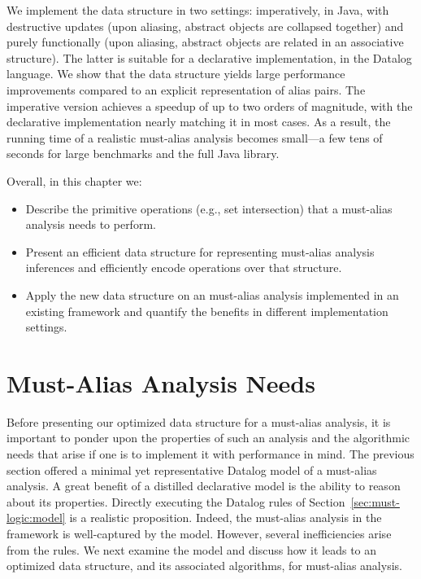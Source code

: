 We implement the data structure in two settings: imperatively, in Java, with destructive updates (upon aliasing, abstract objects are collapsed together) and purely functionally (upon aliasing, abstract objects are related in an associative structure). The latter is suitable for a declarative implementation, in the Datalog language. We show that the data structure yields large performance improvements compared to an explicit representation of alias pairs. The imperative version achieves a speedup of up to two orders of magnitude, with the declarative implementation nearly matching it in most cases. As a result, the running time of a realistic must-alias analysis becomes small---a few tens of seconds for large benchmarks and the full Java library.

Overall, in this chapter we:

\begin{itemize}
\item Describe the primitive operations (e.g., set intersection) that a must-alias analysis needs to perform.
\item Present an efficient data structure for representing must-alias analysis inferences and efficiently encode operations over that structure.
\item Apply the new data structure on an must-alias analysis implemented in an existing framework and quantify the benefits in different implementation settings.
\end{itemize}


\section{Must-Alias Analysis Needs}
\label{sec:must-data:needs}

Before presenting our optimized data structure for a must-alias analysis, it is important to ponder upon the properties of such an analysis and the algorithmic needs that arise if one is to implement it with performance in mind. The previous section offered a minimal yet representative Datalog model of a must-alias analysis. A great benefit of a distilled declarative model is the ability to reason about its properties. Directly executing the Datalog rules of Section~\ref{sec:must-logic:model} is a realistic proposition. Indeed, the must-alias analysis in the \doop{} framework is well-captured by the model. However, several inefficiencies arise from the rules. We next examine the model and discuss how it leads to an optimized data structure, and its associated algorithms, for must-alias analysis.


